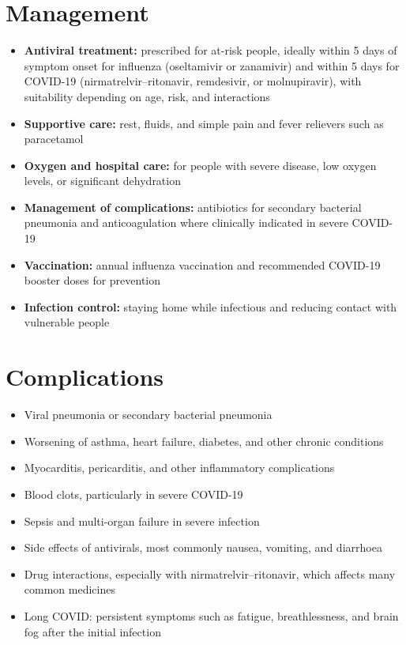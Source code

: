 \section*{Management}
\begin{itemize}
    \item \textbf{Antiviral treatment:} prescribed for at-risk people, ideally within 5 days of symptom onset for influenza (oseltamivir or zanamivir) and within 5 days for COVID-19 (nirmatrelvir--ritonavir, remdesivir, or molnupiravir), with suitability depending on age, risk, and interactions
    \item \textbf{Supportive care:} rest, fluids, and simple pain and fever relievers such as paracetamol
    \item \textbf{Oxygen and hospital care:} for people with severe disease, low oxygen levels, or significant dehydration
    \item \textbf{Management of complications:} antibiotics for secondary bacterial pneumonia and anticoagulation where clinically indicated in severe COVID-19
    \item \textbf{Vaccination:} annual influenza vaccination and recommended COVID-19 booster doses for prevention
    \item \textbf{Infection control:} staying home while infectious and reducing contact with vulnerable people
\end{itemize}

\section*{Complications}
\begin{itemize}
    \item Viral pneumonia or secondary bacterial pneumonia
    \item Worsening of asthma, heart failure, diabetes, and other chronic conditions
    \item Myocarditis, pericarditis, and other inflammatory complications
    \item Blood clots, particularly in severe COVID-19
    \item Sepsis and multi-organ failure in severe infection
    \item Side effects of antivirals, most commonly nausea, vomiting, and diarrhoea
    \item Drug interactions, especially with nirmatrelvir--ritonavir, which affects many common medicines
    \item Long COVID: persistent symptoms such as fatigue, breathlessness, and brain fog after the initial infection
\end{itemize}

